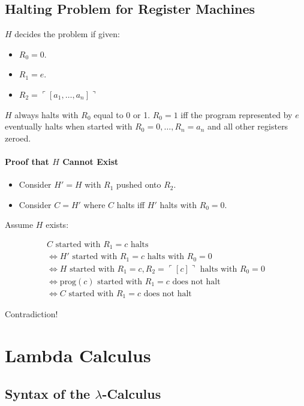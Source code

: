 \documentclass[twocolumn,english]{article}
\begin{document}
\subsection{Halting Problem for Register Machines}

$H$ decides the problem if given:
\begin{itemize}
\item $R_{0}=0$.
\item $R_{1}=e$.
\item $R_{2}=\ulcorner\left[a_{1},\dots,a_{n}\right]\urcorner$
\end{itemize}
$H$ always halts with $R_{0}$ equal to 0 or 1. $R_{0}=1$ iff the
program represented by $e$ eventually halts when started with $R_{0}=0,\dots,R_{n}=a_{n}$
and all other registers zeroed.

\paragraph{Proof that $H$ Cannot Exist}
\begin{itemize}
\item Consider $H'=H$ with $R_{1}$ pushed onto $R_{2}$.
\item Consider $C=H'$ where $C$ halts iff $H'$ halts with $R_{0}=0$.
\end{itemize}
Assume $H$ exists:

\begin{multline*}
C\text{ started with }R_{1}=c\text{ halts}\\
\iff H'\text{ started with }R_{1}=c\text{ halts with }R_{0}=0\\
\iff H\text{ started with }R_{1}=c,R_{2}=\ulcorner\left[c\right]\urcorner\text{ halts with }R_{0}=0\\
\iff\text{prog}\left(c\right)\text{ started with }R_{1}=c\text{ does not halt}\\
\iff C\text{ started with }R_{1}=c\text{ does not halt}
\end{multline*}

Contradiction!

\section{Lambda Calculus}

\subsection{Syntax of the $\lambda$-Calculus}
\end{document}
